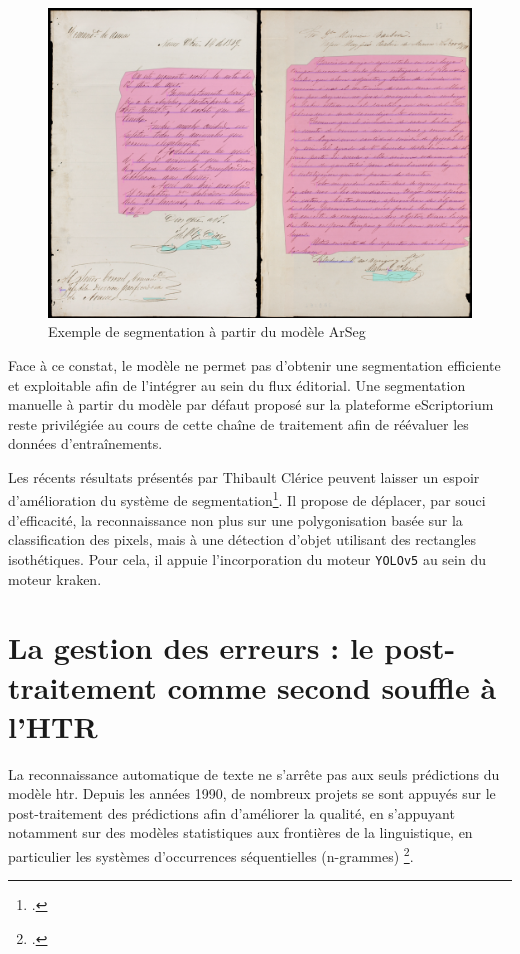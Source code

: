 	\begin{figure}[p]
	    \centering
	    \includegraphics[width=1\textwidth]{annexes/img/segment_model.png}
	    \caption{Exemple de segmentation à partir du modèle ArSeg}
	    \label{fig:segment_model}
	\end{figure}
	
    Face à ce constat, le modèle ne permet pas d'obtenir une segmentation efficiente  et exploitable afin de l'intégrer au sein du flux éditorial. Une segmentation manuelle à partir du modèle par défaut proposé sur la plateforme \gls{eScriptorium} reste privilégiée au cours de cette chaîne de traitement afin de réévaluer les données d'entraînements.
    
	Les récents résultats présentés par Thibault Clérice peuvent laisser un espoir d'amélioration du système de segmentation\footcite{clericeYouActuallyLook2022}. Il propose de déplacer, par souci d'efficacité, la reconnaissance non plus sur une polygonisation basée sur la classification des pixels, mais à une détection d'objet utilisant des rectangles isothétiques. Pour cela, il appuie l'incorporation du moteur \texttt{YOLOv5} au sein du moteur \gls{kraken}.
	
	\section{La gestion des erreurs : le post-traitement comme second souffle à l'HTR}
	
	La reconnaissance automatique de texte ne s'arrête pas aux seuls prédictions du modèle \gls{htr}. Depuis les années 1990, de nombreux projets se sont appuyés sur le post-traitement des prédictions afin d'améliorer la qualité, en s'appuyant notamment sur des modèles statistiques aux frontières de la linguistique, en particulier les systèmes d'occurrences séquentielles (n-grammes) \footcite{takahashiSpellingCorrectionMethod1990, tongStatisticalApproachAutomatic1996}.
	
